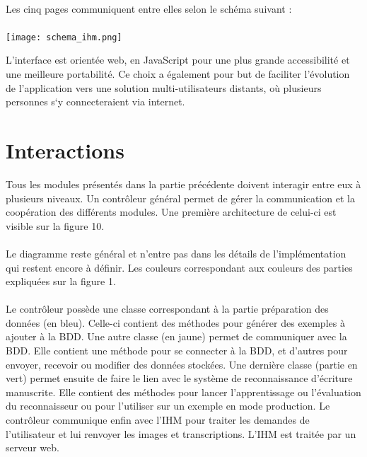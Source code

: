 \paragraph{}
Les cinq pages communiquent entre elles selon le schéma suivant :

\paragraph{}
\begin{mdframed}[frametitle={Figure 10 : Organisation de l'IHM}, innerbottommargin=10]
\begin{center}
\texttt{[image: schema\_ihm.png]}
\end{center}
\end{mdframed}

L’interface est orientée web, en JavaScript pour une plus grande accessibilité 
et une meilleure portabilité. Ce choix a également pour but de faciliter 
l’évolution de l’application vers une solution multi-utilisateurs distants, 
où plusieurs personnes s‘y connecteraient via internet.

\section{Interactions}

Tous les modules présentés dans la partie précédente doivent interagir entre
eux à plusieurs niveaux. Un contrôleur général permet de gérer la communication
et la coopération des différents modules. Une première architecture de celui-ci
est visible sur la figure 10.

\paragraph{}
Le diagramme reste général et n’entre pas dans les détails de l’implémentation
qui restent encore à définir. Les couleurs correspondant aux couleurs des
parties expliquées sur la figure 1.

\paragraph{}
Le contrôleur possède une classe correspondant à la partie préparation des
données (en bleu). Celle-ci contient des méthodes pour générer des exemples
à ajouter à la BDD. Une autre classe (en jaune) permet de communiquer avec
la BDD. Elle contient une méthode pour se connecter à la BDD, et d’autres pour
envoyer, recevoir ou modifier des données stockées. Une dernière classe
(partie en vert) permet ensuite de faire le lien avec le système de
reconnaissance d’écriture manuscrite. Elle contient des méthodes pour lancer
l’apprentissage ou l’évaluation du reconnaisseur ou pour l’utiliser sur un
exemple en mode production. Le contrôleur communique enfin avec l’IHM pour
traiter les demandes de l’utilisateur et lui renvoyer les images et
transcriptions. L’IHM est traitée par un serveur web.

